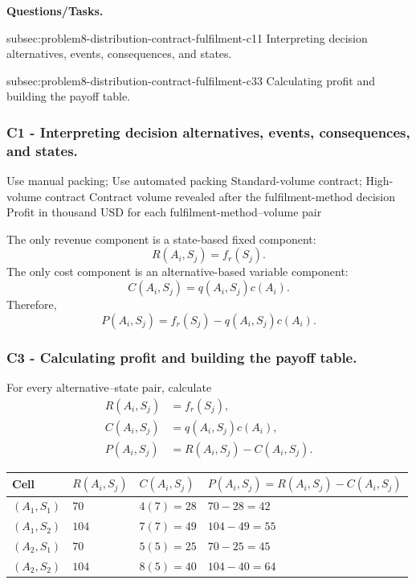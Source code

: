 \textbf{Questions/Tasks.}
\begin{enumerate}
	\CriterionTask
	{subsec:problem8-distribution-contract-fulfilment-c1}{1}
	{Interpreting decision alternatives, events, consequences, and states.}

	\CriterionTask
	{subsec:problem8-distribution-contract-fulfilment-c3}{3}
	{Calculating profit and building the payoff table.}
\end{enumerate}

\subsubsection*{C1 - Interpreting decision alternatives, events, consequences, and states.}
\label{subsec:problem8-distribution-contract-fulfilment-c1}

\DecisionElementsTable
{Use manual packing; Use automated packing}
{Standard-volume contract; High-volume contract}
{Contract volume revealed after the fulfilment-method decision}
{Profit in thousand USD for each fulfilment-method--volume pair}

The only revenue component is a state-based fixed component:
\[
R(A_i,S_j)=f_r(S_j).
\]
The only cost component is an alternative-based variable component:
\[
C(A_i,S_j)=q(A_i,S_j)c(A_i).
\]
Therefore,
\[
P(A_i,S_j)
=
f_r(S_j)
-
q(A_i,S_j)c(A_i).
\]


\subsubsection*{C3 - Calculating profit and building the payoff table.}
\label{subsec:problem8-distribution-contract-fulfilment-c3}

For every alternative--state pair, calculate
\[
\begin{aligned}
	R(A_i,S_j)&=f_r(S_j),
	\\
	C(A_i,S_j)&=q(A_i,S_j)c(A_i),
	\\
	P(A_i,S_j)&=R(A_i,S_j)-C(A_i,S_j).
\end{aligned}
\]

\begin{center}
	\small
	\begin{tabular}{llll}
		\toprule
		Cell
		& \(R(A_i,S_j)\)
		& \(C(A_i,S_j)\)
		& \(P(A_i,S_j)=R(A_i,S_j)-C(A_i,S_j)\) \\
		\midrule
		\((A_1,S_1)\)
		& \(70\)
		& \(4(7)=28\)
		& \(70-28=42\) \\
		
		\((A_1,S_2)\)
		& \(104\)
		& \(7(7)=49\)
		& \(104-49=55\) \\
		
		\((A_2,S_1)\)
		& \(70\)
		& \(5(5)=25\)
		& \(70-25=45\) \\
		
		\((A_2,S_2)\)
		& \(104\)
		& \(8(5)=40\)
		& \(104-40=64\) \\
		\bottomrule
	\end{tabular}
\end{center}

